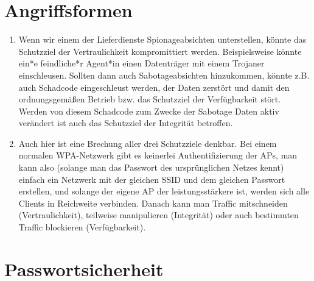 \documentclass[a4paper,11pt]{scrartcl}
\begin{document}
\section{Angriffsformen}
\label{sec:Angriffsformen}

\begin{enumerate}[1.]
    \item
        Wenn wir einem der Lieferdienste Spionageabsichten unterstellen, könnte
        das Schutzziel der Vertraulichkeit kompromittiert werden. Beispielsweise
        könnte ein*e feindliche*r Agent*in einen Datenträger mit einem Trojaner
        einschleusen. Sollten dann auch Sabotageabsichten hinzukommen, könnte
        z.B. auch Schadcode eingeschleust werden, der Daten zerstört und damit
        den ordnungsgemäßen Betrieb bzw. das Schutzziel der Verfügbarkeit stört.
        Werden von diesem Schadcode zum Zwecke der Sabotage Daten aktiv verändert
        ist auch das Schutzziel der Integrität betroffen.

    \item
        Auch hier ist eine Brechung aller drei Schutzziele denkbar. Bei einem
        normalen WPA-Netzwerk gibt es keinerlei Authentifizierung der APs,
        man kann also (solange man das Passwort des ursprünglichen Netzes kennt)
        einfach ein Netzwerk mit der gleichen SSID und dem gleichen Passwort
        erstellen, und solange der eigene AP der leistungsstärkere ist, werden
        sich alle Clients in Reichweite verbinden. Danach kann man Traffic
        mitschneiden (Vertraulichkeit), teilweise manipulieren (Integrität)
        oder auch bestimmten Traffic blockieren (Verfügbarkeit).
\end{enumerate}

\section{Passwortsicherheit}
\label{sec:Passwortsicherheit}
\end{document}
